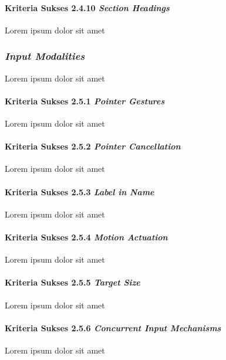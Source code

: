 \paragraph{Kriteria Sukses 2.4.10 \textit{Section Headings}}
\label{sec:kriteria_sukses_2.4.10}
Lorem ipsum dolor sit amet

\subsubsection{\textit{Input Modalities}}
\label{sec:input_modalities}
Lorem ipsum dolor sit amet

\paragraph{Kriteria Sukses 2.5.1 \textit{Pointer Gestures}}
\label{sec:kriteria_sukses_2.5.1}
Lorem ipsum dolor sit amet

\paragraph{Kriteria Sukses 2.5.2 \textit{Pointer Cancellation}}
\label{sec:kriteria_sukses_2.5.2}
Lorem ipsum dolor sit amet

\paragraph{Kriteria Sukses 2.5.3 \textit{Label in Name}}
\label{sec:kriteria_sukses_2.5.3}
Lorem ipsum dolor sit amet

\paragraph{Kriteria Sukses 2.5.4 \textit{Motion Actuation}}
\label{sec:kriteria_sukses_2.5.4}
Lorem ipsum dolor sit amet

\paragraph{Kriteria Sukses 2.5.5 \textit{Target Size}}
\label{sec:kriteria_sukses_2.5.5}
Lorem ipsum dolor sit amet

\paragraph{Kriteria Sukses 2.5.6 \textit{Concurrent Input Mechanisms}}
\label{sec:kriteria_sukses_2.5.6}
Lorem ipsum dolor sit amet


